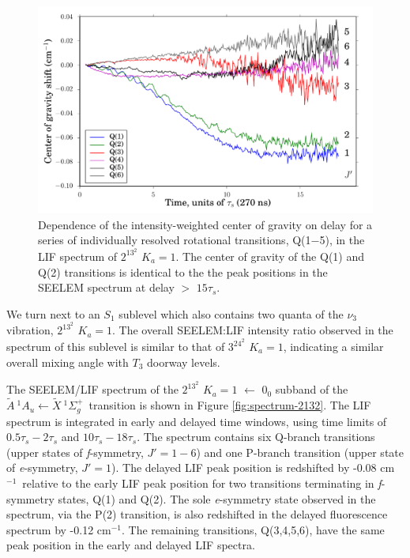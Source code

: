 \documentclass[12pt]{mitthesis}
\newcommand{\rcm}{cm$^{-1}$}
\newcommand{\AtoX}{$
  \tilde{A} \: ^1\!A_u 
  \leftarrow 
  \tilde{X} \: ^1\Sigma_g^+
  $}
\newcommand{\Ka}[1]{$K_a\!\!=\!#1$}
\begin{document}
\begin{figure}
  \caption{Dependence of the intensity-weighted center of gravity on
    delay for a series of individually resolved rotational
    transitions, Q(1$-$5), in the LIF spectrum of $2^13^2$ \Ka{1}.
    The center of gravity of the Q(1) and Q(2) transitions is
    identical to the the peak positions in the SEELEM spectrum at
    delay $>$ $15\tau_s$.}
  \label{fig:2132-q123456-cog-delay}
  \centering
  \vspace{1cm}
  \includegraphics[width=6in]{2132-q123456-cog-delay.pdf}
\end{figure}


We turn next to an $S_1$ sublevel which also contains two quanta of
the $\nu_3$ vibration, $2^13^2$ \Ka{1}.  The overall SEELEM:LIF
intensity ratio observed in the spectrum of this sublevel is similar
to that of $3^24^2$ \Ka{1}, indicating a similar overall mixing angle
with $T_3$ doorway levels.

The SEELEM/LIF spectrum of the $2^13^2$ \Ka{1} $\leftarrow$ $0_0$
subband of the \AtoX\ transition is shown in Figure
\ref{fig:spectrum-2132}.  The LIF spectrum is integrated in early and
delayed time windows, using time limits of $0.5\tau_s-2\tau_s$ and
$10\tau_s-18\tau_s$.  The spectrum contains six Q-branch transitions
(upper states of \emph{f}-symmetry, $J'=1-6$) and one P-branch
transition (upper state of \emph{e}-symmetry, $J'=1$).  The delayed
LIF peak position is redshifted by -0.08 \rcm\ relative to the early
LIF peak position for two transitions terminating in \emph{f}-symmetry
states, Q(1) and Q(2).  The sole \emph{e}-symmetry state observed in
the spectrum, via the P(2) transition, is also redshifted in the
delayed fluorescence spectrum by -0.12 \rcm.  The remaining
transitions, Q(3,4,5,6), have the same peak position in the early and
delayed LIF spectra.
\end{document}

